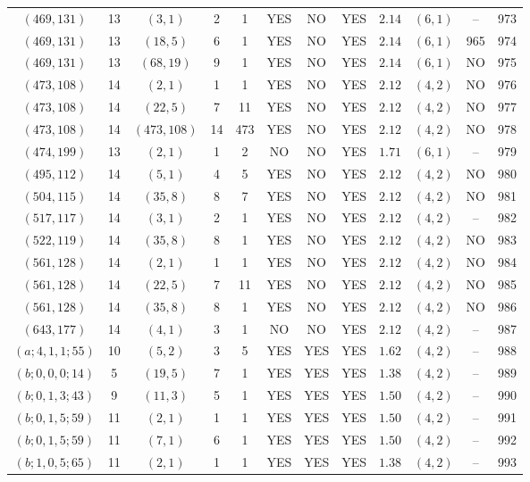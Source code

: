 \begin{longtable}{|c|c|c|c|c|c|c|c|c|c|c|c|}
$(469,131)$ & 13 & $(3,1)$ & 2 & 1 & YES & NO & YES & $2.14$ & $(6,1)$ & -- & 973\\
$(469,131)$ & 13 & $(18,5)$ & 6 & 1 & YES & NO & YES & $2.14$ & $(6,1)$ & 965 & 974\\
$(469,131)$ & 13 & $(68,19)$ & 9 & 1 & YES & NO & YES & $2.14$ & $(6,1)$ & NO & 975\\
$(473,108)$ & 14 & $(2,1)$ & 1 & 1 & YES & NO & YES & $2.12$ & $(4,2)$ & NO & 976\\
$(473,108)$ & 14 & $(22,5)$ & 7 & 11 & YES & NO & YES & $2.12$ & $(4,2)$ & NO & 977\\
$(473,108)$ & 14 & $(473,108)$ & 14 & 473 & YES & NO & YES & $2.12$ & $(4,2)$ & NO & 978\\
$(474,199)$ & 13 & $(2,1)$ & 1 & 2 & NO & NO & YES & $1.71$ & $(6,1)$ & -- & 979\\
$(495,112)$ & 14 & $(5,1)$ & 4 & 5 & YES & NO & YES & $2.12$ & $(4,2)$ & NO & 980\\
$(504,115)$ & 14 & $(35,8)$ & 8 & 7 & YES & NO & YES & $2.12$ & $(4,2)$ & NO & 981\\
$(517,117)$ & 14 & $(3,1)$ & 2 & 1 & YES & NO & YES & $2.12$ & $(4,2)$ & -- & 982\\
$(522,119)$ & 14 & $(35,8)$ & 8 & 1 & YES & NO & YES & $2.12$ & $(4,2)$ & NO & 983\\
$(561,128)$ & 14 & $(2,1)$ & 1 & 1 & YES & NO & YES & $2.12$ & $(4,2)$ & NO & 984\\
$(561,128)$ & 14 & $(22,5)$ & 7 & 11 & YES & NO & YES & $2.12$ & $(4,2)$ & NO & 985\\
$(561,128)$ & 14 & $(35,8)$ & 8 & 1 & YES & NO & YES & $2.12$ & $(4,2)$ & NO & 986\\
$(643,177)$ & 14 & $(4,1)$ & 3 & 1 & NO & NO & YES & $2.12$ & $(4,2)$ & -- & 987\\
$(a;4,1,1;55)$ & 10 & $(5,2)$ & 3 & 5 & YES & YES & YES & $1.62$ & $(4,2)$ & -- & 988\\
$(b;0,0,0;14)$ & 5 & $(19,5)$ & 7 & 1 & YES & YES & YES & $1.38$ & $(4,2)$ & -- & 989\\
$(b;0,1,3;43)$ & 9 & $(11,3)$ & 5 & 1 & YES & YES & YES & $1.50$ & $(4,2)$ & -- & 990\\
$(b;0,1,5;59)$ & 11 & $(2,1)$ & 1 & 1 & YES & YES & YES & $1.50$ & $(4,2)$ & -- & 991\\
$(b;0,1,5;59)$ & 11 & $(7,1)$ & 6 & 1 & YES & YES & YES & $1.50$ & $(4,2)$ & -- & 992\\
$(b;1,0,5;65)$ & 11 & $(2,1)$ & 1 & 1 & YES & YES & YES & $1.38$ & $(4,2)$ & -- & 993\\

\end{longtable}
